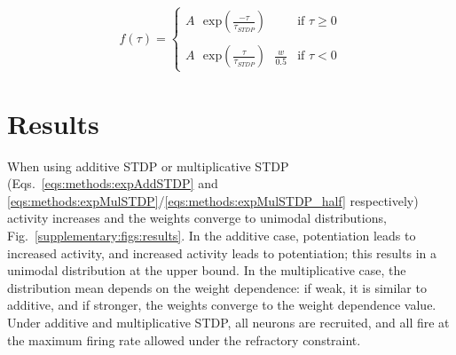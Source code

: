 \documentclass[utf8]{frontiers_suppmat} %
\begin{document}
\begin{equation}
    f(\tau) = 	\begin{cases}
                    A\text{ } \mathrm{exp} \left (%
                    \frac{-\tau}{\tau_{STDP}} \right ) & \mbox{if } \tau \geq 0 \\ \\
                    A\text{ } \mathrm{exp} \left (%
                    \frac{\tau}{\tau_{STDP}} \right ) \text{ } \frac{w}{0.5} & \mbox{if } \tau < 0
                \end{cases}
    \label{eqs:methods:expMulSTDP_half}
\end{equation}

\section{Results}

When using additive STDP or multiplicative STDP (Eqs.~\ref{eqs:methods:expAddSTDP} and \ref{eqs:methods:expMulSTDP}/\ref{eqs:methods:expMulSTDP_half} respectively) activity increases and the weights converge to unimodal distributions, Fig.~\ref{supplementary:figs:results}. In the additive case, potentiation leads to increased activity, and increased activity leads to potentiation; this results in a unimodal distribution at the upper bound. In the multiplicative case, the distribution mean depends on the weight dependence: if weak, it is similar to additive, and if stronger, the weights converge to the weight dependence value. Under additive and multiplicative STDP, all neurons are recruited, and all fire at the maximum firing rate allowed under the refractory constraint.


\end{document}
